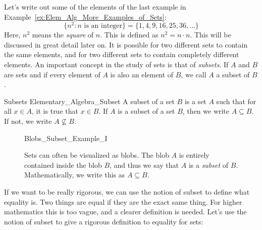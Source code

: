 \documentclass[crop=false,class=book,oneside]{standalone}
\begin{document}
            Let's write out some of the elements of the
            last example in
            Example~\ref{ex:Elem_Alg_More_Examples_of_Sets}:
            \begin{equation}
                \{n^{2}:n\textrm{ is an integer}\}
                =\{1,4,9,16,25,36,\hdots\}
            \end{equation}
            Here, $n^{2}$ means the \textit{square} of
            $n$. This is defined as $n^{2}=n\cdot{n}$. This
            will be discussed in great detail later on.
            It is possible for two different
            sets to contain the
            same elements, and for two different
            sets to contain
            completely different elements.
            An important concept in the study of
            sets is that of \textit{subsets}. If
            $A$ and $B$ are sets and if every
            element of $A$ is also an element of $B$,
            we call $A$ a subset of $B$.
            \begin{fdefinition}{Subsets}
                {Elementary_Algebra_Subset}
                A subset of a set $B$ is a set $A$
                such that for all $x\in{A}$,
                it is true that $x\in{B}$. If $A$ is a
                subset of a set $B$, then we write
                $A\subseteq{B}$. If not, we write
                $A\not\subseteq{B}$.
            \end{fdefinition}
            \begin{figure}[H]
                \centering
                \captionsetup{type=figure}
                {Blobs_Subset_Example_I}
                \caption[Visual for Subsets]
                        {Sets can often be visualized as blobs.
                         The blob $A$ is entirely contained
                         inside the blob $B$, and thus we say
                         that $A$ is a
                         \textit{subset} of $B$. Mathematically,
                         we write this
                         as $A\subseteq{B}$.}
                \label{fig:Elem_Alg_Subsets_Example}
            \end{figure}
            If we want to be really rigorous, we can use the
            notion of subset to define what equality is.
            Two things are equal if they are
            the exact same thing. For higher mathematics this
            is too vague, and a clearer definition is needed.
            Let's use the notion of subset to give a rigorous
            definition to equality for sets:
\end{document}
